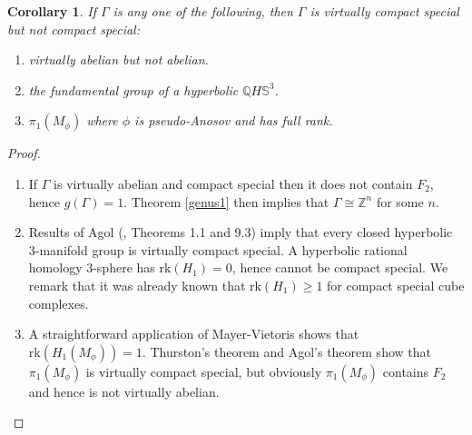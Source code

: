 \documentclass[11pt]{amsart}
\newtheorem{thm}{Theorem}
\numberwithin{thm}{section}
\newtheorem{corollary}[thm]{Corollary}
\theoremstyle{remark}
\theoremstyle{definition}
\newtheorem{definition}[thm]{Definition}
\newcommand{\Z}{\mathbb{Z}}
\newcommand{\Q}{\mathbb{Q}}
\newcommand{\Sa}{\mathbb{S}}
\newcommand{\til}{\widetilde}
\begin{document}
\begin{corollary} If $\Gamma$ is any one of the following, then $\Gamma$ is virtually compact special but not compact special:
\begin{enumerate}
\item virtually abelian but not abelian.
\item the fundamental group of a hyperbolic $\Q H\Sa^3$.  
\item $\pi_1(M_\phi)$ where $\phi$ is pseudo-Anosov and has full rank.   
\end{enumerate}
\end{corollary}
\begin{proof} 

\begin{enumerate}
\item If $\Gamma$ is virtually abelian and compact special then it does not contain $F_2$, hence $g(\Gamma)=1$.  Theorem \ref{genus1} then implies that $\Gamma\cong\Z^n$ for some $n$.  
\item Results of Agol (\cite{Ag13}, Theorems 1.1 and 9.3)  imply that every closed hyperbolic 3-manifold group is virtually compact special.  A hyperbolic rational homology 3-sphere has $\text{rk}(H_1)=0$, hence cannot be compact special. We remark that it was already known that $\text{rk}(H_1)\geq1$ for compact special cube complexes.  
\item A straightforward application of Mayer-Vietoris shows that $\text{rk}(H_1(M_\phi))=1$.  Thurston's theorem and Agol's theorem show that $\pi_1(M_\phi)$ is virtually compact special, but obviously $\pi_1(M_\phi)$ contains $F_2$ and hence is not virtually abelian.  
\end{enumerate}
\end{proof}
%
\end{document}

